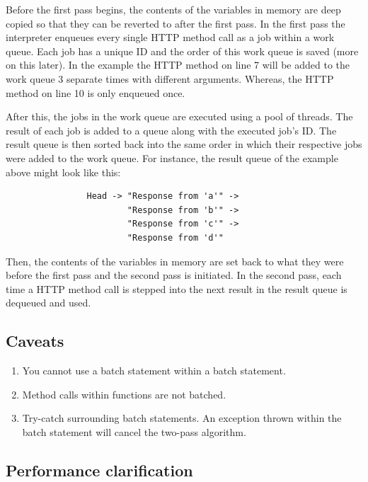 \documentclass[]{interim}
\theoremstyle{definition}
\begin{document}
Before the first pass begins, the contents of the variables in memory are deep copied so that they can be reverted to after the first pass. In the first pass the interpreter enqueues every single HTTP method call as a job within a work queue. Each job has a unique ID and the order of this work queue is saved (more on this later). In the example the HTTP method on line 7 will be added to the work queue 3 separate times with different arguments. Whereas, the HTTP method on line 10 is only enqueued once.

After this, the jobs in the work queue are executed using a pool of threads. The result of each job is added to a queue along with the executed job's ID. The result queue is then sorted back into the same order in which their respective jobs were added to the work queue. For instance, the result queue of the example above might look like this:

\begin{center}
    \begin{verbatim}
                Head -> "Response from 'a'" ->
                        "Response from 'b'" ->
                        "Response from 'c'" ->
                        "Response from 'd'"
    \end{verbatim}
\end{center}

Then, the contents of the variables in memory are set back to what they were before the first pass and the second pass is initiated. In the second pass, each time a HTTP method call is stepped into the next result in the result queue is dequeued and used.

\subsection{Caveats}

\begin{enumerate}
    \item You cannot use a batch statement within a batch statement.
    \item Method calls within functions are not batched.
    \item Try-catch surrounding batch statements. An exception thrown within the batch statement will cancel the two-pass algorithm.
\end{enumerate}

\subsection{Performance clarification}
\end{document}
